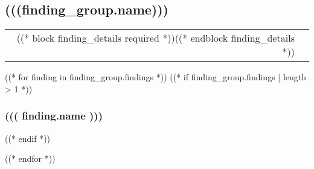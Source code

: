 \subsection{(((finding_group.name)))}

\begin{tcolorbox}
\begin{longtable}{ r l }
  ((* block finding_details required *))((* endblock finding_details *))
\end{longtable}
\end{tcolorbox}

((* for finding in finding_group.findings *))
  ((* if finding_group.findings | length > 1 *))
    \subsubsection{((( finding.name )))}
  ((* endif *))
    
((* endfor *))